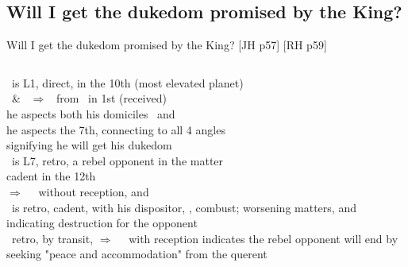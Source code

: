 \subsection{Will I get the dukedom promised by the King?}
\begin{frame}[t]{Will I get the dukedom promised by the King? [JH p57] [RH p59]}
\begin{columns}[T, onlytextwidth]
\Jupiter\ is L1, direct, in the 10th (most elevated planet) \\
\hspace{1em}\Sun\ \& \Venus\ $\Rightarrow$ \Square\ from \Sagittarius\ in 1st (received) \\
\hspace{1em}he aspects both his domiciles \Sagittarius\ and \Pisces\ \\
\hspace{1em}he aspects the 7th, connecting to all 4 angles \\
\hspace{1em}signifying he will get his dukedom\\
\vspace{0.5em}
\Mercury\ is L7, retro, a rebel opponent in the matter \\
\hspace{1em}cadent in the 12th \\
\hspace{1em}$\Rightarrow$ \Opposition\ \Saturn\ without reception, and \\
\vspace{0.2cm}
\Saturn\ is retro, cadent, with his dispositor, \Venus, combust; worsening matters, and indicating destruction for the opponent \\
\vspace{0.5em}
\Mercury\ retro, by transit, $\Rightarrow$ \Sextile\ \Jupiter\ with reception indicates the rebel opponent will end by seeking "peace and accommodation" from the querent


\end{columns}
\end{frame}
